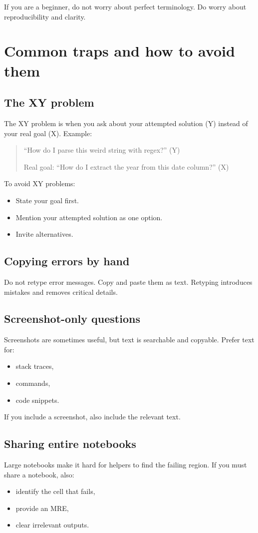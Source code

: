 If you are a beginner, do not worry about perfect terminology. Do worry about reproducibility and clarity.

\section{Common traps and how to avoid them}
\subsection{The XY problem}
The XY problem is when you ask about your attempted solution (Y) instead of your real goal (X). Example:

\begin{quote}
``How do I parse this weird string with regex?'' (Y)

Real goal: ``How do I extract the year from this date column?'' (X)
\end{quote}

To avoid XY problems:
\begin{itemize}[noitemsep]
  \item State your goal first.
  \item Mention your attempted solution as one option.
  \item Invite alternatives.
\end{itemize}

\subsection{Copying errors by hand}
Do not retype error messages. Copy and paste them as text. Retyping introduces mistakes and removes critical details.

\subsection{Screenshot-only questions}
Screenshots are sometimes useful, but text is searchable and copyable. Prefer text for:
\begin{itemize}[noitemsep]
  \item stack traces,
  \item commands,
  \item code snippets.
\end{itemize}

If you include a screenshot, also include the relevant text.

\subsection{Sharing entire notebooks}
Large notebooks make it hard for helpers to find the failing region. If you must share a notebook, also:
\begin{itemize}[noitemsep]
  \item identify the cell that fails,
  \item provide an MRE,
  \item clear irrelevant outputs.
\end{itemize}

